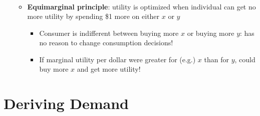 \documentclass{article}
\begin{document}
\begin{itemize}
\begin{itemize}
\begin{itemize}
\begin{align*}
		\end{align*}
		\end{itemize}
	\item \textbf{Equimarginal principle}: utility is optimized when individual can get no more utility by spending \$1 more on either $x$ or $y$
	\begin{itemize}
		\item Consumer is indifferent between buying more $x$ or buying more $y$: has no reason to change consumption decisions! 
		\item If marginal utility per dollar were greater for (e.g.) $x$ than for $y$, could buy more $x$ and get more utility! 
	\end{itemize}
	\end{itemize} 
\end{itemize}

\clearpage 
\section*{Deriving Demand}
\end{document}

